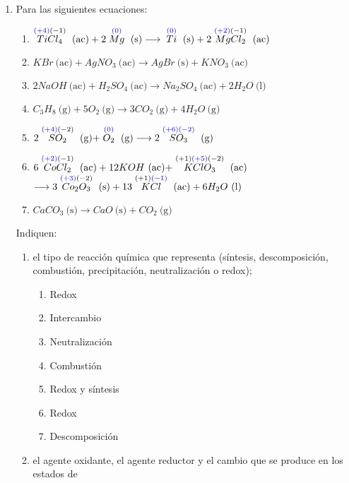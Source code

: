 \documentclass[../Práctica.root.tex]{subfiles}
\newcommand{\lra}{\ensuremath{\longrightarrow{}}}
\newcommand{\sr}[2]{\stackrel{#1}{#2}}
\newcommand{\eac}{\ \text{(ac)}}
\newcommand{\es}{\ \text{(s)}}
\newcommand{\el}{\ \text{(l)}}
\newcommand{\eg}{\ \text{(g)}}
\begin{document}
\begin{enumerate}
    \item Para las siguientes ecuaciones: \\
          \begin{enumerate}
              \item $\sr{\blue{(+4)}(-1)}{TiCl_4} \eac + 2 \sr{\blue{(0)}}{Mg} \es \lra \sr{\blue{(0)}}{Ti} \es + 2 \sr{\blue{(+2)}(-1)}{MgCl_2} \eac$
              \item $KBr \eac + AgNO_3 \eac \lra AgBr \es + KNO_3 \eac$
              \item $2 NaOH \eac + H_2SO_4 \eac \lra Na_2SO_4 \eac + 2 H_2O \el$
              \item $C_3H_8 \eg + 5 O_2 \eg \lra 3 CO_2 \eg + 4 H_2O \eg$
              \item $2 \sr{\blue{(+4)}(-2)}{SO_2} \eg + \sr{\blue{(0)}}{O_2} \eg \lra 2 \sr{\blue{(+6)(-2)}}{SO_3} \eg$
              \item $6 \sr{\blue{(+2)}(-1)}{CoCl_2} \eac + 12 KOH \eac + \sr{(+1)\blue{(+5)}(-2)}{KClO_3} \eac$
                    $\lra 3 \sr{\blue{(+3)}(-2)}{Co_2O_3} \es + 13 \sr{(+1)\blue{(-1)}}{KCl} \eac + 6 H_2O \el$
              \item $CaCO_3 \es \lra CaO \es + CO_2 \eg$
          \end{enumerate}
          Indiquen:
          \begin{enumerate}
              \item el tipo de reacción química que representa (síntesis, descomposición, combustión,
                    precipitación, neutralización o redox);
                    \begin{enumerate}[label=\alph*)]
                        \item Redox
                        \item Intercambio
                        \item Neutralización
                        \item Combustión
                        \item Redox y síntesis
                        \item Redox
                        \item Descomposición
                    \end{enumerate}
              \item el agente oxidante, el agente reductor y el cambio que se produce en los estados de

\end{enumerate}
\end{enumerate}
\end{document}
